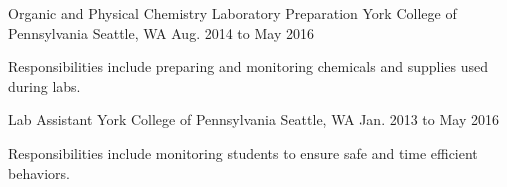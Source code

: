 \begin{cventries}

  \cventry
    {Organic and Physical Chemistry Laboratory Preparation} %
    {York College of Pennsylvania} %
    {Seattle, WA} %
    {Aug. 2014 to May 2016} %
    {
      \begin{cvitems} %
        \item {Responsibilities include preparing and monitoring chemicals and supplies used during labs.}
      \end{cvitems}
    }

  \cventry
    {Lab Assistant} %
    {York College of Pennsylvania} %
    {Seattle, WA} %
    {Jan. 2013 to May 2016} %
    {
      \begin{cvitems} %
        \item {Responsibilities include monitoring students to ensure safe and time efficient behaviors.}
      \end{cvitems}
    }


\end{cventries}
